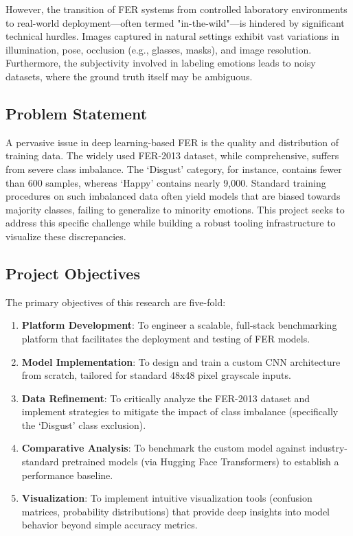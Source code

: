 \documentclass[a4paper,12pt]{article}
\begin{document}
However, the transition of FER systems from controlled laboratory environments to real-world deployment—often termed "in-the-wild"—is hindered by significant technical hurdles. Images captured in natural settings exhibit vast variations in illumination, pose, occlusion (e.g., glasses, masks), and image resolution. Furthermore, the subjectivity involved in labeling emotions leads to noisy datasets, where the ground truth itself may be ambiguous.

\subsection{Problem Statement}
A pervasive issue in deep learning-based FER is the quality and distribution of training data. The widely used FER-2013 dataset, while comprehensive, suffers from severe class imbalance. The `Disgust' category, for instance, contains fewer than 600 samples, whereas `Happy' contains nearly 9,000. Standard training procedures on such imbalanced data often yield models that are biased towards majority classes, failing to generalize to minority emotions. This project seeks to address this specific challenge while building a robust tooling infrastructure to visualize these discrepancies.

\subsection{Project Objectives}
The primary objectives of this research are five-fold:
\begin{enumerate}
    \item \textbf{Platform Development}: To engineer a scalable, full-stack benchmarking platform that facilitates the deployment and testing of FER models.
    \item \textbf{Model Implementation}: To design and train a custom CNN architecture from scratch, tailored for standard 48x48 pixel grayscale inputs.
    \item \textbf{Data Refinement}: To critically analyze the FER-2013 dataset and implement strategies to mitigate the impact of class imbalance (specifically the `Disgust' class exclusion).
    \item \textbf{Comparative Analysis}: To benchmark the custom model against industry-standard pretrained models (via Hugging Face Transformers) to establish a performance baseline.
    \item \textbf{Visualization}: To implement intuitive visualization tools (confusion matrices, probability distributions) that provide deep insights into model behavior beyond simple accuracy metrics.
\end{enumerate}
\end{document}
